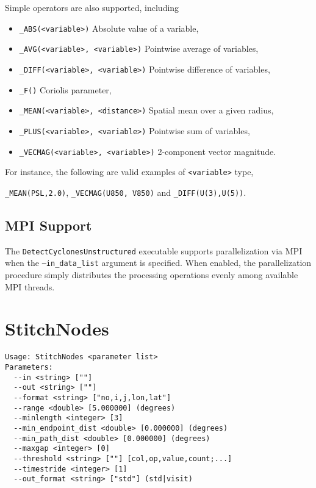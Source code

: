 \documentclass{article}
\begin{document}
Simple operators are also supported, including
\begin{itemize}
\item[] \texttt{\_ABS(<variable>)} Absolute value of a variable,
\item[] \texttt{\_AVG(<variable>, <variable>)} Pointwise average of variables,
\item[] \texttt{\_DIFF(<variable>, <variable>)} Pointwise difference of variables,
\item[] \texttt{\_F()}  Coriolis parameter,
\item[] \texttt{\_MEAN(<variable>, <distance>)} Spatial mean over a given radius,
\item[] \texttt{\_PLUS(<variable>, <variable>)} Pointwise sum of variables,
\item[] \texttt{\_VECMAG(<variable>, <variable>)} 2-component vector magnitude.
\end{itemize}  For instance, the following are valid examples of \texttt{<variable>} type,
\begin{center}
\texttt{\_MEAN(PSL,2.0)}, \quad \texttt{\_VECMAG(U850, V850)} \quad and \quad \texttt{\_DIFF(U(3),U(5))}.
\end{center}

\subsection{MPI Support} \label{sec:MPI}

The \texttt{DetectCyclonesUnstructured} executable supports parallelization via MPI when the \texttt{--in\_data\_list} argument is specified.  When enabled, the parallelization procedure simply distributes the processing operations evenly among available MPI threads.

\section{StitchNodes}

\begin{verbatim}
Usage: StitchNodes <parameter list>
Parameters:
  --in <string> [""] 
  --out <string> [""] 
  --format <string> ["no,i,j,lon,lat"] 
  --range <double> [5.000000] (degrees)
  --minlength <integer> [3] 
  --min_endpoint_dist <double> [0.000000] (degrees)
  --min_path_dist <double> [0.000000] (degrees)
  --maxgap <integer> [0] 
  --threshold <string> [""] [col,op,value,count;...]
  --timestride <integer> [1] 
  --out_format <string> ["std"] (std|visit)
\end{verbatim}
\end{document}
